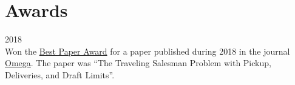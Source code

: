 \section*{Awards}

\begin{paracol}{2}
  2018
\switchcolumn
  \\
  Won the \href{https://santini.in/files/cv/omega-best-paper-18.pdf}{Best Paper Award} for a paper published during 2018 in the journal \href{https://www.journals.elsevier.com/omega}{Omega}.
  The paper was ``The Traveling Salesman Problem with Pickup, Deliveries, and Draft Limits''.
\end{paracol}